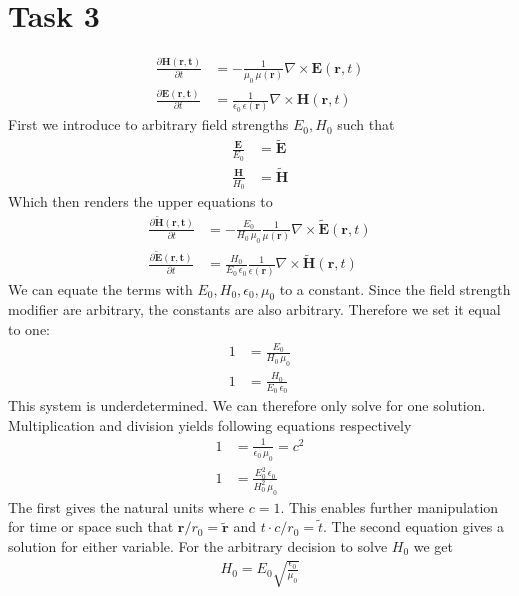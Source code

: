 \documentclass[12pt,a4paper]{article}
\begin{document}
\section*{Task 3}
	\begin{align}
		\frac{\partial \mathbf{H}(\mathbf{r,t})}{\partial t}&=-\frac{1}{\mu_0\,\mu(\mathbf{r})}\nabla\times\mathbf{E}(\mathbf{r},t)\\
		\frac{\partial \mathbf{E}(\mathbf{r,t})}{\partial t}&=\frac{1}{\epsilon_0\,\epsilon(\mathbf{r})}\nabla\times\mathbf{H}(\mathbf{r},t)
	\end{align}
	First we introduce to arbitrary field strengths \(E_0, H_0\) such that
	\begin{align}
		\frac{\mathbf{E}}{E_0}&=\widetilde{\mathbf{E}} \\
		\frac{\mathbf{H}}{H_0}&=\widetilde{\mathbf{H}}
	\end{align}
	Which then renders the upper equations to
	\begin{align}
		\frac{\partial \widetilde{\mathbf{H}}(\mathbf{r,t})}{\partial t}&=-\frac{E_0}{H_0\,\mu_0}\frac{1}{\mu(\mathbf{r})}\nabla\times\widetilde{\mathbf{E}}(\mathbf{r},t)\\
		\frac{\partial \widetilde{\mathbf{E}}(\mathbf{r,t})}{\partial t}&=\frac{H_0}{E_0\,\epsilon_0}\frac{1}{\epsilon(\mathbf{r})}\nabla\times\widetilde{\mathbf{H}}(\mathbf{r},t)
	\end{align}
	We can equate the terms with \(E_0,H_0,\epsilon_0,\mu_0\) to a constant.
	Since the field strength modifier are arbitrary, the constants are also arbitrary.
	Therefore we set it equal to one:
	\begin{align}
		1&=\frac{E_0}{H_0\,\mu_0} \\
		1&=\frac{H_0}{E_0\,\epsilon_0}
	\end{align}
	This system is underdetermined. We can therefore only solve for one solution.
	Multiplication and division yields following equations respectively
	\begin{align}
		1&=\frac{1}{\epsilon_0\,\mu_0}=c^2 \\
		1&=\frac{E_0^2\,\epsilon_0}{H_0^2\,\mu_0}
	\end{align}
	The first gives the natural units where \(c=1\). This enables further manipulation
	for time or space such that \(\mathbf{r}/r_0=\widetilde{\mathbf{r}}\) and
	\(t\cdot c/r_0=\widetilde{t}\). The second equation gives a solution for either variable.
	For the arbitrary decision to solve \(H_0\) we get
	\begin{align}
		H_0=E_0\sqrt{\frac{\epsilon_0}{\mu_0}}
	\end{align}
\end{document}

